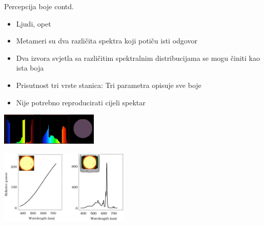 \documentclass[9pt]{beamer}
\begin{document}
\begin{frame}{Percepcija boje contd.}
	\begin{itemize}
		\item Ljudi, opet
		\item Metameri su dva različita spektra koji potiču isti odgovor
		\item Dva izvora svjetla sa različitim spektralnim distribucijama se mogu činiti kao ista boja

		\item Prisutnost tri vrste stanica: Tri parametra opisuje sve boje	
		\item Nije potrebno reproducirati cijeli spektar
	\end{itemize}

	\begin{center}
		\includegraphics[height=1.5cm]{slike/02_vidljivi_spektar3.png}
	\end{center}
\begin{center}
	\includegraphics[height=3.5cm]{slike/color_slide_046_cropped.jpg}
\end{center}
\end{frame}
\end{document}
